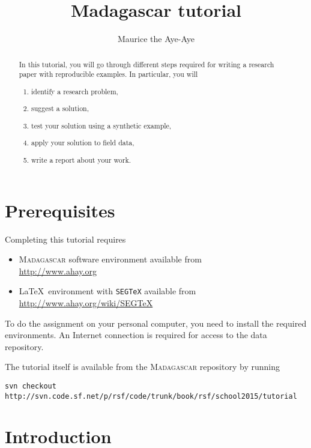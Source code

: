 \author{Maurice the Aye-Aye}
\title{Madagascar tutorial}


\maketitle

\begin{abstract}
  In this tutorial, you will go through different steps required for writing a research paper with reproducible examples. In particular, you will
  \begin{enumerate}
    \item identify a research problem,
    \item suggest a solution,
    \item test your solution using a synthetic example,
    \item apply your solution to field data,
    \item write  a report about your work.
  \end{enumerate}
\end{abstract}

\section{Prerequisites}

Completing this tutorial requires
\begin{itemize}
\item \textsc{Madagascar} software environment available from \\
\url{http://www.ahay.org}
\item \LaTeX\ environment with \texttt{SEGTeX} available from \\ 
\url{http://www.ahay.org/wiki/SEGTeX}
\end{itemize}
To do the assignment on your personal computer, you need to install
the required environments. An Internet connection is required for
access to the data repository.

The tutorial itself is available from the \textsc{Madagascar} repository
by running
\begin{verbatim}
svn checkout http://svn.code.sf.net/p/rsf/code/trunk/book/rsf/school2015/tutorial
\end{verbatim}

\section{Introduction}

